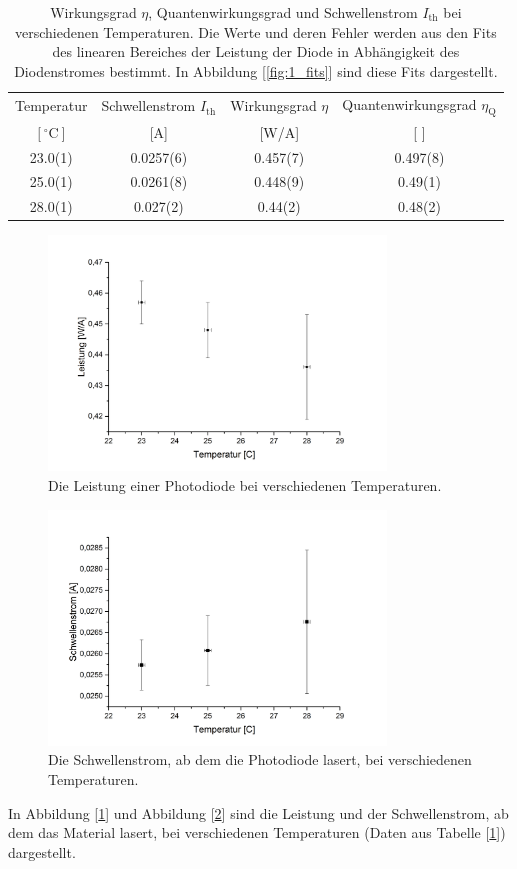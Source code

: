 \documentclass[a4paper,10pt]{scrartcl} %
\begin{document}
\begin{table}
\centering
\begin{tabular}{||c|c|c|c||}
Temperatur & Schwellenstrom $I_{\text{th}}$ & Wirkungsgrad $\eta$ & Quantenwirkungsgrad $\eta_{\text{Q}}$\\
$[ ^\circ{\text{C}}]$ & [A]	& [W/A] & [ ]\\
\hline
23.0(1)	& 0.0257(6) & 0.457(7) & 0.497(8)\\
25.0(1) & 0.0261(8) & 0.448(9) & 0.49(1)\\
28.0(1) & 0.027(2) &  0.44(2) & 0.48(2)\\
\end{tabular}
\caption{Wirkungsgrad $\eta$, Quantenwirkungsgrad und Schwellenstrom $I_{\text{th}}$ bei verschiedenen Temperaturen. Die Werte und deren Fehler werden aus den Fits des linearen Bereiches der Leistung der Diode in Abhängigkeit des Diodenstromes bestimmt. In Abbildung [\ref{fig:1_fits}] sind diese Fits dargestellt.}
\label{tab:1}
\end{table}

\begin{figure}
\centering
\caption{Die Leistung einer Photodiode bei verschiedenen Temperaturen.}
\label{fig:1_Leistung}
\includegraphics[width=0.8\textwidth]{Bilder/1_Leistung.png}
\end{figure}
\begin{figure}
\centering
\caption{Die Schwellenstrom, ab dem die Photodiode lasert, bei verschiedenen Temperaturen.}
\label{fig:1_Schwellenstrom}
\includegraphics[width=0.8\textwidth]{Bilder/1_Schwellenstrom.png}
\end{figure}
In Abbildung [\ref{fig:1_Leistung}] und Abbildung [\ref{fig:1_Schwellenstrom}] sind die Leistung und der Schwellenstrom, ab dem das Material lasert, bei verschiedenen Temperaturen (Daten aus Tabelle [\ref{tab:1}]) dargestellt.
\end{document}
